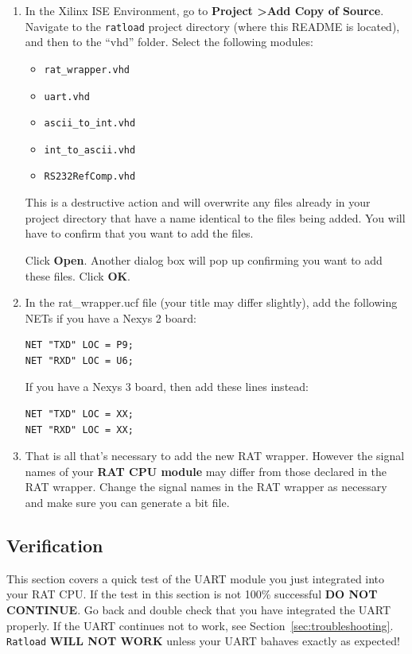 \documentclass[notitlepage]{article}
\newcommand{\warningsign}{\fontencoding{U}\fontfamily{futs}\Large\selectfont\char 66\relax}
\begin{document}
\begin {enumerate}
\item In the Xilinx ISE Environment, go to \textbf{Project \textgreater Add Copy of Source}. Navigate to the \texttt{ratload} project directory (where this README is located), and then to the ``vhd'' folder. Select the following modules:
\begin{itemize}
\item \texttt{rat\_wrapper.vhd}
\item \texttt{uart.vhd}
\item \texttt{ascii\_to\_int.vhd}
\item \texttt{int\_to\_ascii.vhd}
\item \texttt{RS232RefComp.vhd}
\end{itemize}

\begin{infobox}
  {\warningsign} This is a destructive action and will overwrite any files already in your project directory that have a name identical to the files being added. You will have to confirm that you want to add the files.
\end{infobox}

Click \textbf{Open}. Another dialog box will pop up confirming you want to add these files. Click \textbf{OK}.

\item In the rat\_wrapper.ucf file (your title may differ slightly), add the following NETs if you have a Nexys 2 board:
\begin{lstlisting}
NET "TXD" LOC = P9;
NET "RXD" LOC = U6;
\end{lstlisting}

If you have a Nexys 3 board, then add these lines instead:
\begin{lstlisting}
NET "TXD" LOC = XX;
NET "RXD" LOC = XX;
\end{lstlisting}

\item That is all that's necessary to add the new RAT wrapper. However the signal names of your \textbf{RAT CPU module} may differ from those declared in the RAT wrapper. Change the signal names in the RAT wrapper as necessary and make sure you can generate a bit file.
\end{enumerate}

\subsection{Verification}
This section covers a quick test of the UART module you just integrated into your RAT CPU. If the test in this section is not 100\% successful \textbf{DO NOT CONTINUE}. Go back and double check that you have integrated the UART properly. If the UART continues not to work, see Section~\ref{sec:troubleshooting}. \texttt{Ratload} \textbf{WILL NOT WORK} unless your UART bahaves exactly as expected!
\end{document}
